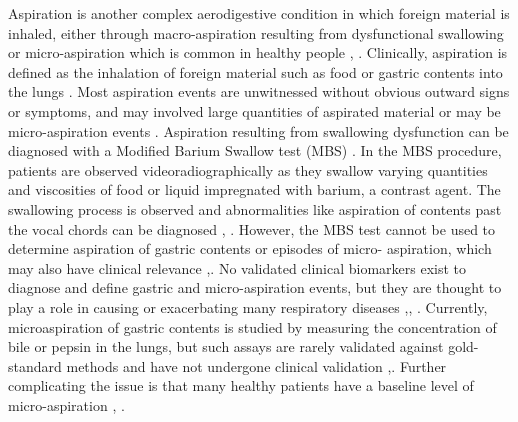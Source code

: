 \documentclass[12pt]{article}
\begin{document}
Aspiration is another complex aerodigestive condition in which foreign material is inhaled, either through macro-aspiration resulting from dysfunctional swallowing or micro-aspiration which is common in healthy people \cite{sweet-gerd_asp-2009}, \cite{dickson-lung_microbiome-2014}.
Clinically, aspiration is defined as the inhalation of foreign material such as food or 
gastric contents into the lungs \cite{raghavendran-asp_injury-2011}. 
Most aspiration events are unwitnessed without obvious outward signs 
or symptoms, and may involved large quantities of aspirated material 
or may be micro-aspiration events \cite{raghavendran-asp_injury-2011}. 
Aspiration resulting from swallowing dysfunction can be diagnosed with 
a Modified Barium Swallow test (MBS) \cite{martinharris-mbs-2008}. In 
the MBS procedure, patients are observed videoradiographically as they 
swallow varying quantities and viscosities of food or liquid 
impregnated with barium, a contrast agent. The swallowing process is 
observed and abnormalities like aspiration of contents past the vocal 
chords can be diagnosed \cite{martinharris-clinical_mbs-2000},
\cite{martinharris-mbs-2008}. However, the MBS test cannot be used to 
determine aspiration of gastric contents or episodes of micro-
aspiration, which may also have clinical relevance 
\cite{raghavendran-asp_injury-2011},\cite{lee-pulm_asp-2014}. No validated clinical 
biomarkers exist to diagnose and define gastric and micro-aspiration 
events\cite{lee-pulm_asp-2014}, but they are thought to play a role in 
causing or exacerbating many respiratory diseases 
\cite{reen-aspirated_bile-2014},\cite{almomani-cf_sputum-2016},
\cite{houghton-microaspiration-2016}. Currently, microaspiration of gastric contents 
is studied by measuring the concentration of bile or pepsin in the 
lungs, but such assays are rarely validated against gold-standard 
methods and have not undergone clinical validation 
\cite{houghton-microaspiration-2016},\cite{lee-pulm_asp-2014}. Further complicating 
the issue is that many healthy patients have a baseline level of 
micro-aspiration \cite{sweet-gerd_asp-2009}, \cite{dickson-lung_microbiome-2014}.
\end{document}
